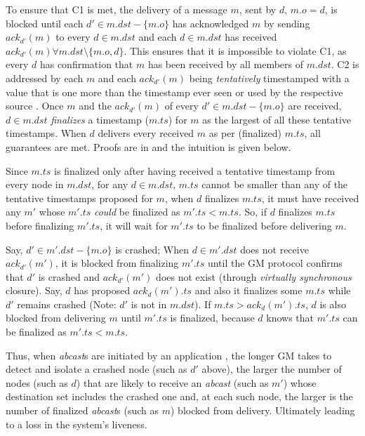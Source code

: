         To ensure that C1 is met, the delivery of a message $m$, sent by $d$, $m.o=d$, is blocked until each $d' \in m.dst-\{m.o\}$ has acknowledged $m$ by sending $ack_{d'}(m)$ to every $d \in m.dst$ and each $d \in m.dst$ has received $ack_{d'}(m) \forall m.dst \setminus \{m.o,d\}$.  This ensures that it is impossible to violate C1, as every $d$ has confirmation that $m$ has been received by all members of $m.dst$.  
        C2 is addressed by each $m$ and each $ack_{d'}(m)$ being \emph{tentatively} timestamped with a value that is one more than the timestamp ever seen or used by the respective source \cite{Lamport:1978:TCO:359545.359563}. Once $m$ and the $ack_{d'}(m)$ of every $d'\in m.dst-\{m.o\}$ are received, $d \in m.dst$ \emph{finalizes} a timestamp ($m.ts$) for $m$ as the largest of all these tentative timestamps. When $d$ delivers every received $m$ as per (finalized) $m.ts$, all guarantees are met. Proofs are in \cite{Lamport:1978:TCO:359545.359563, Birman:1991:LCA:128738.128742, Ezhilchelvan:1995:NFG:876885.880005} and the intuition is given below.
        
        Since $m.ts$ is finalized only after having received a tentative timestamp from every node in $m.dst$, for any $d \in m.dst$, $m.ts$ cannot be smaller than any of the tentative timestamps proposed for $m$, when $d$ finalizes $m.ts$, it must have received any $m'$ whose $m'.ts$ \emph{could} be finalized as $m'.ts < m.ts$. So, if $d$ finalizes $m.ts$ before finalizing $m'.ts$, it will wait for $m'.ts$ to be finalized before delivering $m$.
        
        Say, $d' \in m'.dst - \{m.o\}$ is crashed; When $d \in m'.dst$ does not receive $ack_{d'}(m')$, it is blocked from finalizing $m'.ts$ until the GM protocol confirms that $d'$ is crashed and $ack_{d'}(m')$ does not exist (through \emph{virtually synchronous} closure). Say, $d$ has proposed $ack_d(m').ts$ and also it finalizes some $m.ts$ while $d'$ remains crashed (Note: $d'$ is not in $m.dst$). If $m.ts > ack_d(m').ts$, $d$ is also blocked from delivering $m$ until $m'.ts$ is finalized, because $d$ knows that $m'.ts$ can be finalized as $m'.ts < m.ts$.

Thus, when \emph{abcast}s are initiated by an application , the longer GM takes to detect and isolate a crashed node (such as $d'$ above), the larger the number of nodes (such as $d$) that are likely to receive an \emph{abcast} (such as $m'$) whose destination set includes the crashed one and, at each such node, the larger is the number of finalized \emph{abcast}s (such as $m$) blocked from delivery.  Ultimately leading to a loss in the system's liveness.  

